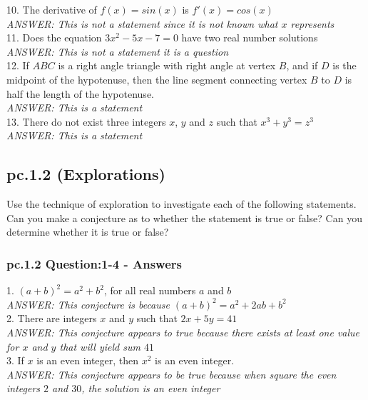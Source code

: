 10. The derivative of $f(x) = sin(x)$ is $f'(x)=cos(x)$ \\
{\it ANSWER: This is not a statement since it is not known what $x$ represents} \\

11. Does the equation $3x^2 - 5x -7 = 0$ have two real number solutions 
{\it ANSWER: This is not a statement it is a question} \\

12. If $ABC$ is a right angle triangle with right angle at vertex $B$, and if $D$ is the midpoint of the hypotenuse, then the line segment connecting vertex $B$ to $D$ is half the length of the hypotenuse. \\
{\it ANSWER: This is a statement} \\

13. There do not exist three integers $x$, $y$ and $z$ such that $x^3 + y^3 = z^3$ \\
{\it ANSWER: This is a statement} \\


\newpage
\subsection{pc.1.2 (Explorations)}
Use the technique of exploration to investigate each of the following statements.
Can you make a conjecture as to whether the statement is true or false? Can you determine whether it is true or false?

\subsubsection*{pc.1.2 Question:1-4 - Answers}


1. $(a+b)^2 = a^2 + b^2$, for all real numbers $a$ and $b$ \\
{\it ANSWER: This conjecture is because $(a+b)^2 = a^2 + 2ab + b^2$} \\

2. There are integers $x$ and $y$ such that $2x + 5y = 41$ \\
{\it ANSWER: This conjecture appears to true because there exists at least one value for $x$ and $y$ that will yield sum $41$} \\

3. If $x$ is an even integer, then $x^2$ is an even integer. \\
{\it ANSWER: This conjecture appears to be true because when square the even integers $2$ and $30$, the solution is an even integer} \\

